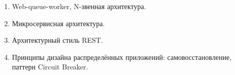 \documentclass[a5paper]{article}
\begin{document}
\begin{enumerate}
    \item Web-queue-worker, N-звенная архитектура.
    \item Микросервисная архитектура.
    \item Архитектурный стиль REST.
    \item Принципы дизайна распределённых приложений: самовосстановление, паттерн Circuit Breaker.
\end{enumerate}
\end{document}
